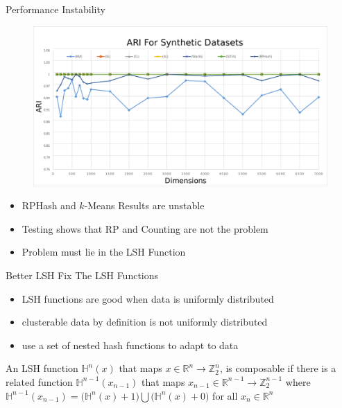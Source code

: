 \documentclass[12pt]{beamer}
\begin{document}
\begin{frame}[plain]{Performance Instability}
\begin{figure}
 \centerline{\includegraphics[width=1.\textwidth]{figs/ari_synthetic}}
\end{figure}
\vspace*{-3\bigskipamount}
\begin{itemize}
 \item RPHash and $k$-Means Results are unstable
 \item Testing shows that RP and Counting are not the problem
 \item Problem must lie in the LSH Function
\end{itemize}
\end{frame}

\begin{frame}[plain]{Better LSH}
Fix The LSH Functions
 \begin{itemize}
  \item LSH functions are good when data is uniformly distributed
  \item clusterable data by definition is not uniformly distributed
  \item use a set of nested hash functions to adapt to data
 \end{itemize}
 \begin{Definition}
 An LSH function $\mathbb{H}^n(x)$ that maps $x \in \mathbb{R}^n \rightarrow \mathbb{Z}^n_2$,
 is composable if there is a related function $\mathbb{H}^{n-1}(x_{n-1})$ that maps $x_{n-1} \in \mathbb{R}^{n-1} \rightarrow \mathbb{Z}^{n-1}_2$
 where
 $\mathbb{H}^{n-1}(x_{n-1}) = \big(\mathbb{H}^n(x)+1\big) \bigcup \big(\mathbb{H}^n(x)+0\big) $ 
 for all $x_{n} \in \mathbb{R}^{n}$
\end{Definition}
\end{frame}
\end{document}
